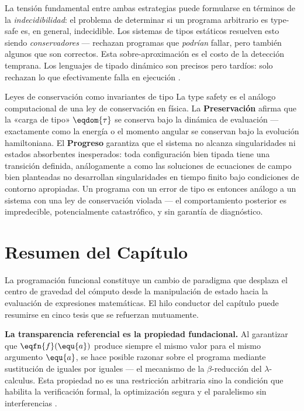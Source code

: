 La tensión fundamental entre ambas estrategias puede formularse en términos de la \textit{indecidibilidad}: el problema de determinar si un programa arbitrario es type-safe es, en general, indecidible. Los sistemas de tipos estáticos resuelven esto siendo \textit{conservadores} — rechazan programas que \textit{podrían} fallar, pero también algunos que son correctos. Esta sobre-aproximación es el costo de la detección temprana. Los lenguajes de tipado dinámico son precisos pero tardíos: solo rechazan lo que efectivamente falla en ejecución \cite{PFPL, TAPL}.

\begin{fisicaconexion}{Leyes de conservación como invariantes de tipo}
La type safety es el análogo computacional de una ley de conservación en física. La \textbf{Preservación} afirma que la «carga de tipo» $\eqdom{\tau}$ se conserva bajo la dinámica de evaluación — exactamente como la energía o el momento angular se conservan bajo la evolución hamiltoniana. El \textbf{Progreso} garantiza que el sistema no alcanza singularidades ni estados absorbentes inesperados: toda configuración bien tipada tiene una transición definida, análogamente a como las soluciones de ecuaciones de campo bien planteadas no desarrollan singularidades en tiempo finito bajo condiciones de contorno apropiadas. Un programa con un error de tipo es entonces análogo a un sistema con una ley de conservación violada — el comportamiento posterior es impredecible, potencialmente catastrófico, y sin garantía de diagnóstico.
\end{fisicaconexion}

\section*{Resumen del Capítulo}

La programación funcional constituye un cambio de paradigma que desplaza el centro de gravedad del cómputo desde la manipulación de estado hacia la evaluación de expresiones matemáticas. El hilo conductor del capítulo puede resumirse en cinco tesis que se refuerzan mutuamente.

\textbf{La transparencia referencial es la propiedad fundacional.} Al garantizar que $\eqfn{f}(\equ{a})$ produce siempre el mismo valor para el mismo argumento $\equ{a}$, se hace posible razonar sobre el programa mediante sustitución de iguales por iguales — el mecanismo de la $\beta$-reducción del $\lambda$-calculus. Esta propiedad no es una restricción arbitraria sino la condición que habilita la verificación formal, la optimización segura y el paralelismo sin interferencias \cite{SICP, PFPL}.

